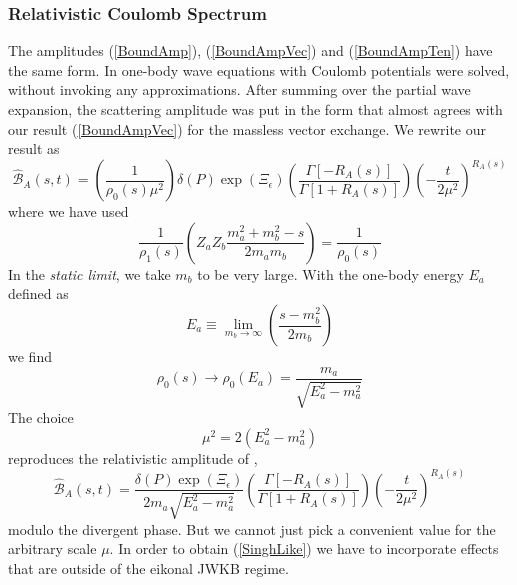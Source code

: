 \subsubsection{Relativistic Coulomb Spectrum}
The amplitudes (\ref{BoundAmp}), (\ref{BoundAmpVec}) and (\ref{BoundAmpTen}) have the same form. In \cite{Singh} one-body wave equations with Coulomb potentials were solved, without invoking any approximations. After summing over the partial wave expansion, the scattering amplitude was put in the form that almost agrees with our result (\ref{BoundAmpVec}) for the massless vector exchange. We rewrite our result as
\begin{equation}
	\widehat{\mathcal{B}}_{A}(s, t) = \left(\frac{1}{\rho_{0}(s) \mu^{2}} \right) \delta(P) \exp{(\Xi_{\epsilon})} \left( \frac{\Gamma[-R_{A}(s)]}{\Gamma[1 + R_{A}(s)]} \right) \left( -\frac{t}{2 \mu^{2}} \right)^{R_{A}(s)}
\end{equation}
where we have used
\begin{equation}
	\frac{1}{\rho_{1}(s)} \left( Z_{a} Z_{b} \frac{m_{a}^{2} + m_{b}^{2} - s}{2 m_{a} m_{b}} \right) = \frac{1}{\rho_{0}(s)}
\end{equation}
In the \textit{static limit}, we take $m_{b}$ to be very large. With the one-body energy $E_{a}$ defined as
\begin{equation}
	E_{a} \equiv \lim_{m_{b} \rightarrow \infty} \left( \frac{s - m_{b}^{2}}{2 m_{b}} \right)
\end{equation}
we find
\begin{equation}
	\rho_{0}(s) \longrightarrow \rho_{0}(E_{a}) = \frac{m_{a}}{\sqrt{E_{a}^{2} - m_{a}^{2}}}
\end{equation}
The choice
\begin{equation}
	\mu^{2} = 2 (E_{a}^{2} - m_{a}^{2}) \label{choice}
\end{equation}
reproduces the relativistic amplitude of \cite{Singh},
\begin{equation}
	\widehat{\mathcal{B}}_{A}(s, t) = \frac{\delta(P) \exp{(\Xi_{\epsilon})}}{2m_{a}\sqrt{E_{a}^{2} - m_{a}^{2}}} \left( \frac{\Gamma[-R_{A}(s)]}{\Gamma[1 + R_{A}(s)]} \right) \left( -\frac{t}{2 \mu^{2}} \right)^{R_{A}(s)} \label{SinghLike}
\end{equation}
modulo the divergent phase. But we cannot just pick a convenient value for the arbitrary scale $\mu$. In order to obtain (\ref{SinghLike}) we have to incorporate effects that are outside of the eikonal JWKB regime.

